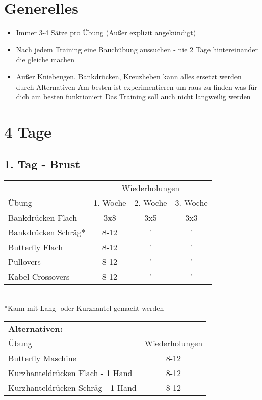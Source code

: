 \documentclass[10pt,a4paper]{article}
\author{Aaron Winziers}
\begin{document}
	\tableofcontents
\section{Generelles}
	\begin{itemize}
		\item Immer 3-4 Sätze pro Übung (Außer explizit angekündigt)
		\item Nach jedem Training eine Bauchübung aussuchen - nie 2 Tage hintereinander die gleiche machen
		\item Außer Kniebeugen, Bankdrücken, Kreuzheben kann alles ersetzt werden durch Alternativen
		\subitem Am besten ist experimentieren um raus zu finden was für dich am besten funktioniert
		\subitem Das Training soll auch nicht langweilig werden
	\end{itemize}
\section{4 Tage}
	\subsection{1. Tag - Brust}
		\begin{tabular}{l||c|c|c}
			& \multicolumn{3}{c}{Wiederholungen} \\ 
			Übung & 1. Woche & 2. Woche & 3. Woche \\ 
			\hline
			\hline 
			Bankdrücken Flach & 3x8 & 3x5 & 3x3 \\ 
			\hline 
			Bankdrücken Schräg*	& 8-12 & " & " \\ 
			\hline
			Butterfly Flach & 8-12 & " & " \\ 
			\hline
			Pullovers & 8-12 & " & " \\ 
			\hline
			Kabel Crossovers	& 8-12	& "	& "	\\
		\end{tabular} \\
	*Kann mit Lang- oder Kurzhantel gemacht werden
		\vspace{1cm}\\
		\begin{tabular}{lc}
			\multicolumn{2}{l}{\textbf{Alternativen:}}	\\
			Übung	& Wiederholungen	\\
			\hline
			\midrule
			Butterfly Maschine	& 8-12 \\
			Kurzhanteldrücken Flach - 1 Hand	& 8-12	\\
			Kurzhanteldrücken Schräg - 1 Hand	& 8-12	\\
			
		\end{tabular}	\\
		
\end{document}
